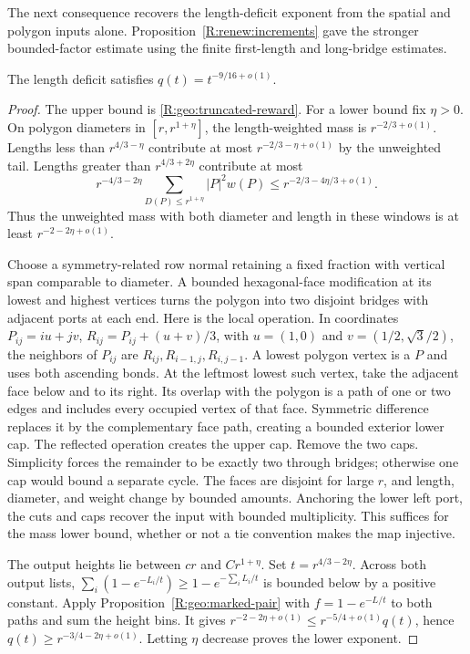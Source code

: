 The next consequence recovers the length-deficit exponent from the
spatial and polygon inputs alone.  Proposition~\ref{R:renew:increments}
gave the stronger bounded-factor estimate using the finite first-length
and long-bridge estimates.
\begin{corollary}\label{R:geo:deficit}
The length deficit satisfies $q(t)=t^{-9/16+o(1)}$.
\end{corollary}
\begin{proof}
The upper bound is \eqref{R:geo:truncated-reward}.  For a lower bound
fix $\eta>0$.  On polygon diameters in $[r,r^{1+\eta}]$, the
length-weighted mass is $r^{-2/3+o(1)}$.  Lengths less than
$r^{4/3-\eta}$ contribute at most $r^{-2/3-\eta+o(1)}$ by the
unweighted tail.  Lengths greater than $r^{4/3+2\eta}$ contribute
at most
\[
 r^{-4/3-2\eta}\sum_{D(P)\le r^{1+\eta}}|P|^2w(P)
       \le r^{-2/3-4\eta/3+o(1)}.
\]
Thus the unweighted mass with both diameter and length in these
windows is at least $r^{-2-2\eta+o(1)}$.

Choose a symmetry-related row normal retaining a fixed fraction with
vertical span comparable to diameter.  A bounded hexagonal-face
modification at its lowest and highest vertices turns the polygon
into two disjoint bridges with adjacent ports at each end.  Here is
the local operation.  In coordinates
$P_{ij}=iu+jv$, $R_{ij}=P_{ij}+(u+v)/3$, with
$u=(1,0)$ and $v=(1/2,\sqrt3/2)$, the neighbors of $P_{ij}$ are
$R_{ij},R_{i-1,j},R_{i,j-1}$.  A lowest polygon vertex is a $P$
and uses both ascending bonds.  At the leftmost lowest such vertex,
take the adjacent face below and to its right.  Its overlap with the
polygon is a path of one or two edges and includes every occupied
vertex of that face.  Symmetric difference replaces it by the
complementary face path, creating a bounded exterior lower cap.
The reflected operation creates the upper cap.  Remove the two caps.
Simplicity forces the remainder to be exactly two through bridges;
otherwise one cap would bound a separate cycle.  The faces are
disjoint for large $r$, and length, diameter, and weight change by
bounded amounts.  Anchoring the lower left port, the cuts and caps
recover the input with bounded multiplicity.  This suffices for the
mass lower bound, whether or not a tie convention makes the map
injective.

The output heights lie between $cr$ and $Cr^{1+\eta}$.  Set
$t=r^{4/3-2\eta}$.  Across both output lists,
$\sum_i(1-e^{-L_i/t})\ge1-e^{-\sum_iL_i/t}$ is bounded below by a
positive constant.  Apply Proposition~\ref{R:geo:marked-pair} with
$f=1-e^{-L/t}$ to both paths and sum the height bins.  It gives
$r^{-2-2\eta+o(1)}\le r^{-5/4+o(1)}q(t)$, hence
$q(t)\ge r^{-3/4-2\eta+o(1)}$.  Letting $\eta$ decrease proves
the lower exponent.
\end{proof}

